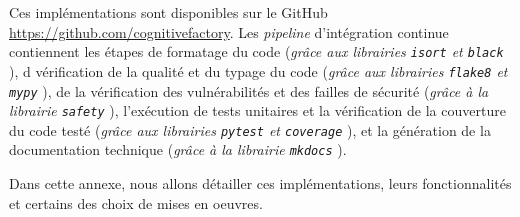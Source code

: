 	\setcounter{localCounterOfFootnoteValue}{\value{footnote}}
	\begin{leftBarInformation}
		Ces implémentations sont disponibles sur le GitHub \url{https://github.com/cognitivefactory}.
		Les \textit{pipeline} d'intégration continue contiennent les étapes
		de formatage du code (\textit{grâce aux librairies \texttt{isort} \footnotemark et \texttt{black} \footnotemark}),
		d vérification de la qualité et du typage du code (\textit{grâce aux librairies \texttt{flake8} \footnotemark et \texttt{mypy} \footnotemark}),
		de la vérification des vulnérabilités et des failles de sécurité (\textit{grâce à la librairie \texttt{safety} \footnotemark}),
		l'exécution de tests unitaires et la vérification de la couverture du code testé (\textit{grâce aux librairies \texttt{pytest} \footnotemark et \texttt{coverage} \footnotemark}),
		et la génération de la documentation technique (\textit{grâce à la librairie \texttt{mkdocs} \footnotemark}).
	\end{leftBarInformation}
	
	Dans cette annexe, nous allons détailler ces implémentations, leurs fonctionnalités et certains des choix de mises en oeuvres.
	

